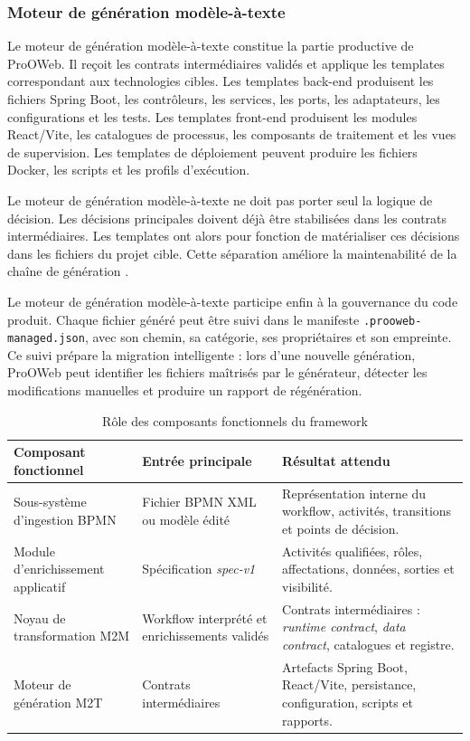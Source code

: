 \subsubsection{Moteur de génération modèle-à-texte}

Le moteur de génération modèle-à-texte constitue la partie productive de ProOWeb. Il reçoit les contrats intermédiaires validés et applique les templates correspondant aux technologies cibles. Les templates back-end produisent les fichiers Spring Boot, les contrôleurs, les services, les ports, les adaptateurs, les configurations et les tests. Les templates front-end produisent les modules React/Vite, les catalogues de processus, les composants de traitement et les vues de supervision. Les templates de déploiement peuvent produire les fichiers Docker, les scripts et les profils d'exécution.

Le moteur de génération modèle-à-texte ne doit pas porter seul la logique de décision. Les décisions principales doivent déjà être stabilisées dans les contrats intermédiaires. Les templates ont alors pour fonction de matérialiser ces décisions dans les fichiers du projet cible. Cette séparation améliore la maintenabilité de la chaîne de génération \cite{syriani2018}.

Le moteur de génération modèle-à-texte participe enfin à la gouvernance du code produit. Chaque fichier généré peut être suivi dans le manifeste \texttt{.prooweb-managed.json}, avec son chemin, sa catégorie, ses propriétaires et son empreinte. Ce suivi prépare la migration intelligente : lors d'une nouvelle génération, ProOWeb peut identifier les fichiers maîtrisés par le générateur, détecter les modifications manuelles et produire un rapport de régénération.

\begin{table}[H]
\centering
\small
\caption{Rôle des composants fonctionnels du framework}
\label{tab:chap3-composants-framework}
\begin{tabular}{p{3.4cm}p{4.4cm}p{6.2cm}}
\hline
\textbf{Composant fonctionnel} & \textbf{Entrée principale} & \textbf{Résultat attendu} \\
\hline
Sous-système d'ingestion BPMN & Fichier BPMN XML ou modèle édité & Représentation interne du workflow, activités, transitions et points de décision. \\
Module d'enrichissement applicatif & Spécification \textit{spec-v1} & Activités qualifiées, rôles, affectations, données, sorties et visibilité. \\
Noyau de transformation M2M & Workflow interprété et enrichissements validés & Contrats intermédiaires : \textit{runtime contract}, \textit{data contract}, catalogues et registre. \\
Moteur de génération M2T & Contrats intermédiaires & Artefacts Spring Boot, React/Vite, persistance, configuration, scripts et rapports. \\
\hline
\end{tabular}
\end{table}


